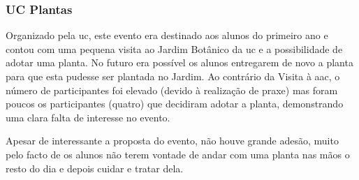 
\subsubsection{UC Plantas}

Organizado pela \acrshort{uc}, este evento era destinado aos alunos do primeiro ano e contou com uma pequena visita ao Jardim Botânico da \acrshort{uc} e a possibilidade de adotar uma planta. No futuro era possível os alunos entregarem de novo a planta para que esta pudesse ser plantada no Jardim. Ao contrário da Visita à \acrshort{aac}, o número de participantes foi elevado (devido à realização de praxe) mas foram poucos os participantes (quatro) que decidiram adotar a planta, demonstrando uma clara falta de interesse no evento.

Apesar de interessante a proposta do evento, não houve grande adesão, muito pelo facto de os alunos não terem vontade de andar com uma planta nas mãos o resto do dia e depois cuidar e tratar dela.
